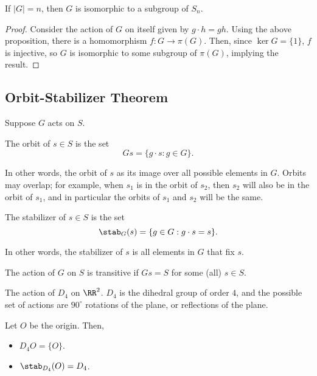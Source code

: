 \begin{theorem}

If $\vert G\vert = n$, then $G$ is isomorphic to a subgroup of $S_n$.
\end{theorem}

\begin{proof}
Consider the action of $G$ on itself given by $g\cdot h = gh$. Using the above proposition, there is a homomorphism $f: G\rightarrow \pi(G)$. Then, since $\ker{G} = \{1\}$, $f$ is injective, so $G$ is isomorphic to some subgroup of $\pi(G)$, implying the result.
\end{proof}

\subsection{Orbit-Stabilizer Theorem}
Suppose $G$ acts on $S$.
\begin{definition}

The \ac{orbit} of $s\in S$ is the set 
\[Gs = \{g\cdot s : g\in G\}.\]
\end{definition}

In other words, the orbit of $s$ as its image over all possible elements in $G$. Orbits may overlap; for example, when $s_1$ is in the orbit of $s_2$, then $s_2$ will also be in the orbit of $s_1$, and in particular the orbits of $s_1$ and $s_2$ will be the same. 

\begin{definition}

The \ac{stabilizer} of $s\in S$ is the set 
\[\stab_G(s) = \{g\in G: g\cdot s=s\}.\]
\end{definition}

In other words, the stabilizer of $s$ is all elements in $G$ that fix $s$. 

\begin{definition}

The action of $G$ on $S$ is \ac{transitive} if $Gs=S$ for some (all) $s\in S$.
\end{definition}

\begin{example}
\exlabel

The action of $D_4$ on $\RR^2$. $D_4$ is the dihedral group of order $4$, and the possible set of actions are $90^{\circ}$ rotations of the plane, or reflections of the plane. 
\end{example}

Let $O$ be the origin. Then,
\begin{itemize}
    \item $D_4O = \{O\}$. 
    \item $\stab_{D_4}(O) = D_4$.
\end{itemize}

